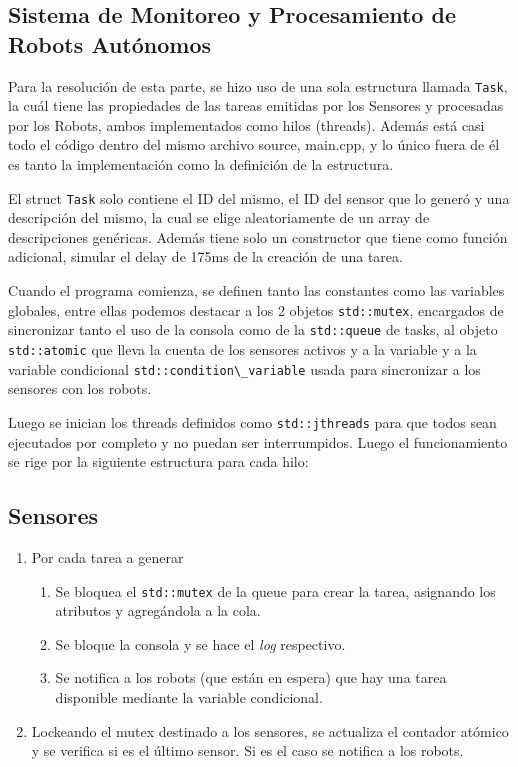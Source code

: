 \documentclass[11pt, a4paper]{article}
\begin{document}
\begin{multicols}{2}
\section{Sistema de Monitoreo y Procesamiento de Robots Autónomos}

Para la resolución de esta parte, se hizo uso de una sola estructura
llamada \lstinline|Task|, la cuál tiene las propiedades de las tareas
emitidas por los Sensores y procesadas por los Robots, ambos
implementados como hilos (threads). Además está casi todo el código
dentro del mismo archivo source, main.cpp, y lo único fuera de él es tanto
la implementación como la definición de la estructura.

El struct \lstinline|Task| solo contiene el ID del mismo, el ID del
sensor que lo generó y una descripción del mismo, la cual se elige aleatoriamente
de un array de descripciones genéricas. Además tiene solo un constructor que tiene
como función adicional, simular el delay de 175ms de la creación de una tarea.

Cuando el programa comienza, se definen tanto las constantes como las variables
globales, entre ellas podemos destacar a los 2 objetos \lstinline|std::mutex|, encargados
de sincronizar tanto el uso de la consola como de la \lstinline|std::queue| de tasks,
al objeto \lstinline|std::atomic| que lleva la cuenta de los sensores activos y a la variable
y a la variable condicional \lstinline|std::condition\_variable| usada para sincronizar a
los sensores con los robots.

Luego se inician los threads definidos como \lstinline|std::jthreads| para que todos sean
ejecutados por completo y no puedan ser interrumpidos. Luego el funcionamiento se rige por 
la siguiente estructura para cada hilo:

\subsection{Sensores}

\begin{enumerate}[label=\Roman*.]
    \item Por cada tarea a generar 
    \begin{enumerate}[label=\roman*.]
        \item Se bloquea el \lstinline|std::mutex| de la queue para crear la tarea,
        asignando los atributos y agregándola a la cola.
        \item Se bloque la consola y se hace el \textit{log} respectivo.
        \item Se notifica a los robots (que están en espera) que hay una tarea disponible
        mediante la variable condicional.
    \end{enumerate}
    \item Lockeando el mutex destinado a los sensores, se actualiza el contador atómico y se 
    verifica si es el último sensor. Si es el caso se notifica a los robots.
\end{enumerate}


\end{multicols}
\end{document}

